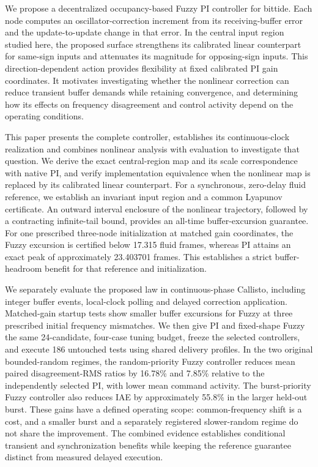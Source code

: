 We propose a decentralized occupancy-based Fuzzy PI controller for bittide. Each node computes an oscillator-correction increment from its receiving-buffer error and the update-to-update change in that error. In the central input region studied here, the proposed surface strengthens its calibrated linear counterpart for same-sign inputs and attenuates its magnitude for opposing-sign inputs. This direction-dependent action provides flexibility at fixed calibrated PI gain coordinates. It motivates investigating whether the nonlinear correction can reduce transient buffer demands while retaining convergence, and determining how its effects on frequency disagreement and control activity depend on the operating conditions.

This paper presents the complete controller, establishes its con\-tinuous-clock realization and combines nonlinear analysis with evaluation to investigate that question. We derive the exact central-region map and its scale correspondence with native PI, and verify implementation equivalence when the nonlinear map is replaced by its calibrated linear counterpart. For a synchronous, zero-delay fluid reference, we establish an invariant input region and a common Lyapunov certificate. An outward interval enclosure of the nonlinear trajectory, followed by a contracting infinite-tail bound, provides an all-time buffer-excursion guarantee. For one prescribed three-node initialization at matched gain coordinates, the Fuzzy excursion is certified below 17.315 fluid frames, whereas PI attains an exact peak of approximately 23.403701 frames. This establishes a strict buffer-headroom benefit for that reference and initialization.

We separately evaluate the proposed law in continuous-phase Callisto,
including integer buffer events, local-clock polling and delayed
correction application. Matched-gain startup tests show smaller buffer
excursions for Fuzzy at three prescribed initial frequency mismatches.
We then give PI and fixed-shape Fuzzy the same 24-candidate,
four-case tuning budget, freeze the selected controllers, and execute
186 untouched tests using shared delivery profiles. In the two
original bounded-random regimes, the random-priority Fuzzy controller
reduces mean paired disagreement-RMS ratios by 16.78\% and 7.85\%
relative to the independently selected PI, with lower mean command
activity. The burst-priority Fuzzy controller also reduces IAE by
approximately 55.8\% in the larger held-out burst. These gains have
a defined operating scope: common-frequency shift is a cost, and a
smaller burst and a separately registered slower-random regime do not
share the improvement. The combined evidence establishes conditional
transient and synchronization benefits while keeping the reference
guarantee distinct from measured delayed execution.

